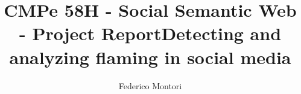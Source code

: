 \documentclass[a4paper,10pt]{report}
\title{CMPe 58H - Social Semantic Web - Project Report\newline Detecting and analyzing flaming in social media}
\author{Federico Montori}
\begin{document}
\maketitle

\begin{abstract}
\end{abstract}
\end{document}
